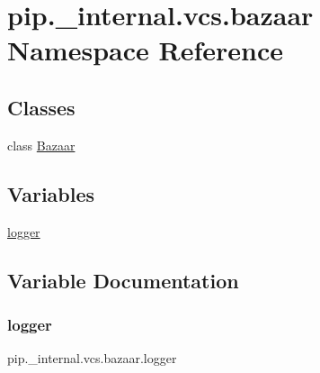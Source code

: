 \hypertarget{namespacepip_1_1__internal_1_1vcs_1_1bazaar}{}\section{pip.\+\_\+internal.\+vcs.\+bazaar Namespace Reference}
\label{namespacepip_1_1__internal_1_1vcs_1_1bazaar}
\subsection*{Classes}
\begin{DoxyCompactItemize}
\item 
class \hyperlink{classpip_1_1__internal_1_1vcs_1_1bazaar_1_1Bazaar}{Bazaar}
\end{DoxyCompactItemize}
\subsection*{Variables}
\begin{DoxyCompactItemize}
\item 
\hyperlink{namespacepip_1_1__internal_1_1vcs_1_1bazaar_adde9e0bf1fbce9072bc425f88d8d60b8}{logger}
\end{DoxyCompactItemize}


\subsection{Variable Documentation}
\mbox{\label{namespacepip_1_1__internal_1_1vcs_1_1bazaar_adde9e0bf1fbce9072bc425f88d8d60b8}} 
\subsubsection{\texorpdfstring{logger}{logger}}
{\footnotesize\ttfamily pip.\+\_\+internal.\+vcs.\+bazaar.\+logger}

